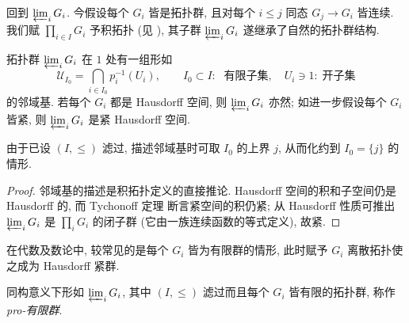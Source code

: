 回到 $\varprojlim_i G_i$. 今假设每个 $G_i$ 皆是拓扑群, 且对每个 $i \leq j$ 同态 $G_j \to G_i$ 皆连续. 我们赋 $\prod_{i \in I} G_i$ 予积拓扑 (见 \cite[\S 3.3]{Xiong}), 其子群 $\varprojlim_i G_i$ 遂继承了自然的拓扑群结构.
\begin{lemma}\label{prop:completion-compactness}
	拓扑群 $\varprojlim_i G_i$ 在 $1$ 处有一组形如
	\[ \mathcal{U}_{I_0} = \bigcap_{i \in I_0} p_i^{-1}(U_i), \qquad I_0 \subset I: \; \text{ 有限子集}, \quad U_i \ni 1: \; \text{开子集} \]
	的邻域基. 若每个 $G_i$ 都是 Hausdorff 空间, 则 $\varprojlim_i G_i$ 亦然; 如进一步假设每个 $G_i$ 皆紧, 则 $\varprojlim_i G_i$ 是紧 Hausdorff 空间.
\end{lemma}
由于已设 $(I, \leq)$ 滤过, 描述邻域基时可取 $I_0$ 的上界 $j$, 从而化约到 $I_0 = \{j\}$ 的情形.
\begin{proof}
	邻域基的描述是积拓扑定义的直接推论. Hausdorff 空间的积和子空间仍是 Hausdorff 的, 而 Tychonoff 定理 \cite[定理 7.7.2]{Xiong} 断言紧空间的积仍紧; 从 Hausdorff 性质可推出 $\varprojlim_i G_i$ 是 $\prod_i G_i$ 的闭子群 (它由一族连续函数的等式定义), 故紧.
\end{proof}

在代数及数论中, 较常见的是每个 $G_i$ 皆为有限群的情形, 此时赋予 $G_i$ 离散拓扑使之成为 Hausdorff 紧群.
\begin{definition}\label{def:profinite-group}
	同构意义下形如 $\varprojlim_i G_i$, 其中 $(I, \leq)$ 滤过而且每个 $G_i$ 皆有限的拓扑群, 称作 \emph{pro-有限群}.
\end{definition}

